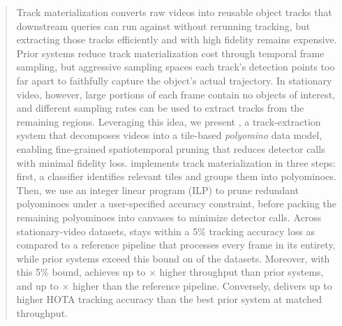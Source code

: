 \begin{abstract}
Track materialization converts raw videos into reusable object tracks that downstream queries can run against without rerunning tracking,
but extracting those tracks efficiently and with high fidelity remains expensive.
Prior systems reduce track materialization cost through temporal frame sampling,
but aggressive sampling spaces each track's detection points too far apart
to faithfully capture the object's actual trajectory.
In stationary video, however,
large portions of each frame contain no objects of interest,
and different sampling rates can be used to extract tracks from the remaining regions.
Leveraging this idea, we present \sys{},
a track-extraction system that decomposes videos into a tile-based \emph{polyomino} data model,
enabling fine-grained spatiotemporal pruning that reduces detector calls with minimal fidelity loss.
\sys{} implements track materialization in three steps: 
first, a classifier identifies relevant tiles and groups them into polyominoes.
Then, we use an integer linear program (ILP) to prune redundant polyominoes under a user-specified accuracy constraint,
before packing the remaining polyominoes into canvases to minimize detector calls.
Across \revisionDatasetCount{} stationary-video datasets,
\sys{} stays within a 5\% tracking accuracy loss as compared to a reference pipeline that processes every frame in its entirety,
while prior systems exceed this bound on \comparePriorFailDatasetsFivePct{}
of the \revisionDatasetCount{} datasets.
Moreover, with this 5\% bound,
\sys{} achieves
up to \compareAccuracyMatchedSpeedupMaxFivePct{}$\times$ higher throughput
than prior systems,
and up to \compareNaiveSpeedupMaxFivePct{}$\times$ higher than the reference pipeline.
Conversely,
\sys{} delivers up to \compareMaxHotaImprovement{} higher HOTA tracking accuracy
than the best prior system at matched throughput.
\end{abstract}
